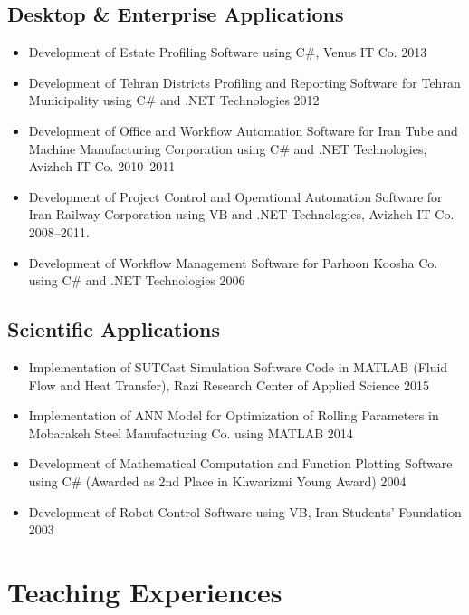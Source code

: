 \documentclass{cv}
\begin{document}
\subsection{Desktop \& Enterprise Applications}

\begin{itemize}

\item
Development of Estate Profiling Software using C\#, Venus IT Co. \hfill 2013
\item
Development of Tehran Districts Profiling and Reporting Software for Tehran Municipality using C\# and .NET Technologies \hfill 2012
\item
Development of Office and Workflow Automation Software for Iran Tube and Machine Manufacturing Corporation using C\# and .NET Technologies, Avizheh IT Co. \hfill 2010--2011
\item
Development of Project Control and Operational Automation Software for Iran Railway Corporation using VB and .NET Technologies, Avizheh IT Co. \hfill 2008--2011.
\item
Development of Workflow Management Software for Parhoon Koosha Co. using C\# and .NET Technologies \hfill 2006

\end{itemize}


\subsection{Scientific Applications}

\begin{itemize}
\item
Implementation of SUTCast Simulation Software Code in MATLAB (Fluid Flow and Heat Transfer), Razi Research Center of Applied Science \hfill 2015
\item
Implementation of ANN Model for Optimization of Rolling Parameters in Mobarakeh Steel Manufacturing Co. using MATLAB \hfill 2014
\item
Development of Mathematical Computation and Function Plotting Software using C\# (Awarded as 2nd Place in Khwarizmi Young Award) \hfill 2004
\item
Development of Robot Control Software using VB, Iran Students' Foundation \hfill 2003

\end{itemize}



\section{Teaching Experiences}
\end{document}
